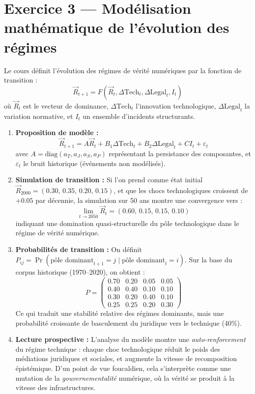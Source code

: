 \documentclass[memoire, 12pt]{report}
\begin{document}
\bigskip

\section{Exercice 3 — Modélisation mathématique de l’évolution des régimes}

Le cours définit l’évolution des régimes de vérité numériques par la fonction de transition :
\[
\vec{R}_{t+1} = F(\vec{R}_t, \Delta \mathrm{Tech}_t, \Delta \mathrm{Legal}_t, I_t)
\]
où $\vec{R}_t$ est le vecteur de dominance, $\Delta \mathrm{Tech}_t$ l’innovation technologique, $\Delta \mathrm{Legal}_t$ la variation normative, et $I_t$ un ensemble d’incidents structurants.

\begin{enumerate}[label=\textbf{\arabic*.}]
    \item \textbf{Proposition de modèle :}
    \[
    \vec{R}_{t+1} = A \vec{R}_t + B_1 \Delta \mathrm{Tech}_t + B_2 \Delta \mathrm{Legal}_t + C I_t + \varepsilon_t
    \]
    avec $A = \mathrm{diag}(a_T,a_J,a_S,a_P)$ représentant la persistance des composantes, et $\varepsilon_t$ le bruit historique (événements non modélisés).
    
    \item \textbf{Simulation de transition :}  
    Si l’on prend comme état initial $\vec{R}_{2000} = (0.30,\,0.35,\,0.20,\,0.15)$, et que les chocs technologiques croissent de $+0.05$ par décennie, la simulation sur 50 ans montre une convergence vers :
    \[
    \lim_{t \to 2050} \vec{R}_t = (0.60,\,0.15,\,0.15,\,0.10)
    \]
    indiquant une domination quasi-structurelle du pôle technologique dans le régime de vérité numérique.
    
    \item \textbf{Probabilités de transition :}
    On définit $P_{ij} = \Pr(\text{pôle dominant}_{t+1}=j \mid \text{pôle dominant}_t=i)$.
    Sur la base du corpus historique (1970–2020), on obtient :
    \[
    P = 
    \begin{pmatrix}
    0.70 & 0.20 & 0.05 & 0.05 \\
    0.40 & 0.40 & 0.10 & 0.10 \\
    0.30 & 0.20 & 0.40 & 0.10 \\
    0.25 & 0.25 & 0.20 & 0.30
    \end{pmatrix}
    \]
    Ce qui traduit une stabilité relative des régimes dominants, mais une probabilité croissante de basculement du juridique vers le technique (40\%).
    
    \item \textbf{Lecture prospective :}  
    L’analyse du modèle montre une \textit{auto-renforcement} du régime technique : chaque choc technologique réduit le poids des médiations juridiques et sociales, et augmente la vitesse de recomposition épistémique. D’un point de vue foucaldien, cela s’interprète comme une mutation de la \textit{gouvernementalité} numérique, où la vérité se produit à la vitesse des infrastructures.
\end{enumerate}
\end{document}
